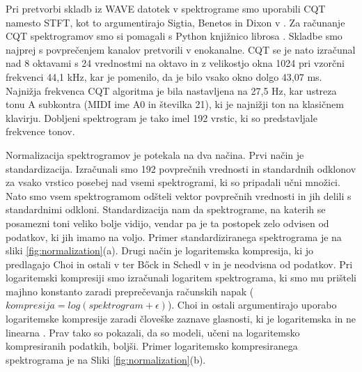\documentclass[a4paper, 12pt, openright]{book}
\begin{document}
Pri pretvorbi skladb iz WAVE datotek v spektrograme smo uporabili CQT namesto STFT, kot to argumentirajo Sigtia, Benetos in Dixon v \cite{sigtia2016endtoend}.
Za računanje CQT spektrogramov smo si pomagali s Python knjižnico {\sf librosa} \cite{mcfee2015librosa}.
Skladbe smo najprej s povprečenjem kanalov pretvorili v enokanalne.
CQT se je nato izračunal nad 8 oktavami s 24 vrednostmi na oktavo in z velikostjo okna 1024 pri vzorčni frekvenci 44,1 kHz, kar je pomenilo, da je bilo vsako okno dolgo 43,07 ms.
Najnižja frekvenca CQT algoritma je bila nastavljena na 27,5 Hz, kar ustreza tonu A subkontra (MIDI ime A0 in številka 21), ki je najnižji ton na klasičnem klavirju.
Dobljeni spektrogram je tako imel 192 vrstic, ki so predstavljale frekvence tonov.

Normalizacija spektrogramov je potekala na dva načina.
Prvi način je standardizacija.
Izračunali smo 192 povprečnih vrednosti in standardnih odklonov za vsako vrstico posebej nad vsemi spektrogrami, ki so pripadali učni množici.
Nato smo vsem spektrogramom odšteli vektor povprečnih vrednosti in jih delili s standardnimi odkloni.
Standardizacija nam da spektrograme, na katerih se posamezni toni veliko bolje vidijo, vendar pa je ta postopek zelo odvisen od podatkov, ki jih imamo na voljo.
Primer standardiziranega spektrograma je na sliki \ref{fig:normalization}(a).
Drugi način je logaritemska kompresija, ki jo predlagajo Choi in ostali v \cite{choi2021comparison} ter Bőck in Schedl v \cite{bock2012rnn} in je neodvisna od podatkov.
Pri logaritemski kompresiji smo izračunali logaritem spektrograma, ki smo mu prišteli majhno konstanto zaradi preprečevanja računskih napak ($ kompresija = log(spektrogram + \epsilon) $).
Choi in ostali argumentirajo uporabo logaritemske kompresije zaradi človeške zaznave glasnosti, ki je logaritemska in ne linearna \cite{moore2012psy}.
Prav tako so pokazali, da so modeli, učeni na logaritemsko kompresiranih podatkih, boljši.
Primer logaritemsko kompresiranega spektrograma je na Sliki \ref{fig:normalization}(b).
\end{document}
